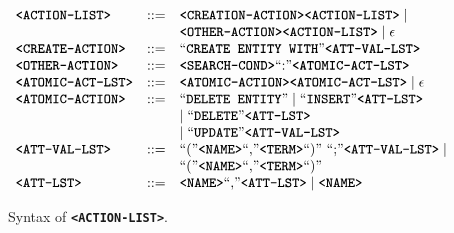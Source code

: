 \documentclass{sig-alternate}
\newcommand{\funcname}[1]{\textbf{\texttt{#1}}}
\newcommand{\nonterm}[1]{\ensuremath{\mbox{\textbf{\texttt{#1}}}}\xspace}
\begin{document}
\begin{figure}[t]
\centering
\begin{small}
$
\begin{array}{lll}
\funcname{<ACTION-LIST>} & ::= & \funcname{<CREATION-ACTION>} \funcname{<ACTION-LIST>}\mid\\
& & \funcname{<OTHER-ACTION>}\funcname{<ACTION-LIST>}\mid\epsilon\\
\funcname{<CREATE-ACTION>} & ::= & \text{``}\nonterm{CREATE ENTITY WITH}\text{''} \funcname{<ATT-VAL-LST>}\\
\funcname{<OTHER-ACTION>} & ::= & \funcname{<SEARCH-COND>}\text{``:''}\funcname{<ATOMIC-ACT-LST>}\\
\funcname{<ATOMIC-ACT-LST>} & ::= & \funcname{<ATOMIC-ACTION>}\funcname{<ATOMIC-ACT-LST>}\mid\epsilon\\
\funcname{<ATOMIC-ACTION>} & ::= & \text{``}\nonterm{DELETE ENTITY}\text{''}\mid\text{``}\nonterm{INSERT}\text{''}\funcname{<ATT-LST>}\\
& & \mid \text{``}\nonterm{DELETE}\text{''}\funcname{<ATT-LST>}\\
& & \mid \text{``}\nonterm{UPDATE}\text{''}\funcname{<ATT-VAL-LST>}\\
\funcname{<ATT-VAL-LST>} & ::= & \text{``(''}\funcname{<NAME>}\text{``,''}\funcname{<TERM>}\text{``)'' ``;''}\funcname{<ATT-VAL-LST>}\mid\\
& & \text{``(''}\funcname{<NAME>}\text{``,''}\funcname{<TERM>}\text{``)''}\\
\funcname{<ATT-LST>} & ::= & \funcname{<NAME>}\text{``,''}\funcname{<ATT-LST>}\mid\funcname{<NAME>}
\end{array}
$
\end{small}
\caption{Syntax of \funcname{<ACTION-LIST>}.\label{fig:syntax}} 
\end{figure}
\end{document}
